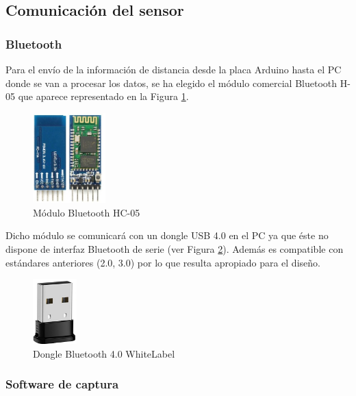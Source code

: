 	\subsection{Comunicación del sensor}
	
		\subsubsection{Bluetooth}
		
		Para el envío de la información de distancia desde la placa Arduino hasta el PC donde se van a procesar los datos, se ha elegido el módulo comercial Bluetooth H-05 que aparece representado en la Figura \ref{fig:bluetooth}.
		
	
			 \begin{figure}[H]
			 	\centering
			 	\includegraphics[width=0.25\textwidth]{./graphics/bluetooth}
			 	\caption{Módulo Bluetooth HC-05} \label{fig:bluetooth}
			 \end{figure}
			 
		Dicho módulo se comunicará con un dongle USB 4.0 en el PC ya que éste no dispone de interfaz Bluetooth de serie (ver Figura \ref{fig:dongle}). Además es compatible con estándares anteriores (2.0, 3.0) por lo que resulta apropiado para el diseño.
		
		
		\begin{figure}[H]
			\centering
			\includegraphics[width=0.15\textwidth]{./graphics/dongle}
			\caption{Dongle Bluetooth 4.0 WhiteLabel} \label{fig:dongle}
		\end{figure}
			
		\subsubsection{Software de captura}
		
